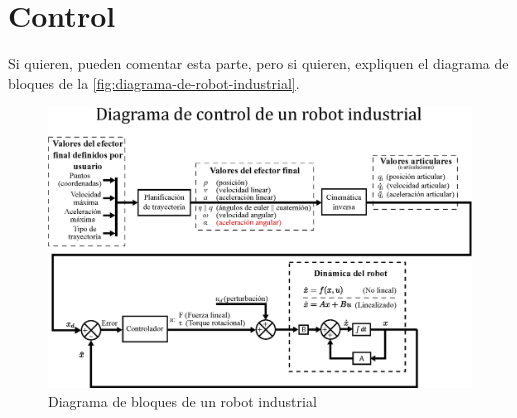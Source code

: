 \section{Control}
Si quieren, pueden comentar esta parte, pero si quieren, expliquen el diagrama de bloques de la \autoref{fig:diagrama-de-robot-industrial}.

\begin{figure}[h]
	\centering
	\includegraphics[width=\linewidth]{img/Diagrama_robot_industrial}
	\caption{Diagrama de bloques de un robot industrial}
	\label{fig:diagrama-de-robot-industrial}
\end{figure}
